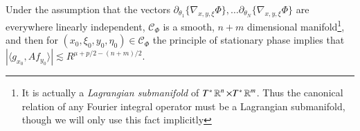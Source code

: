 Under the assumption that the vectors $\partial_{\theta_1} \{ \nabla_{x,y,\xi} \Phi \}, \dots \partial_{\theta_N} \{ \nabla_{x,y,\xi} \Phi \}$ are everywhere linearly independent, $\mathcal{C}_\Phi$ is a smooth, $n + m$ dimensional manifold\footnote{It is actually a \emph{Lagrangian submanifold} of $T^* \operatorname{\mathbb{R}}^n \times T^* \operatorname{\mathbb{R}}^m$. Thus the canonical relation of any Fourier integral operator must be a Lagrangian submanifold, though we will only use this fact implicitly}, and then for $(x_0,\xi_0,y_0,\eta_0) \in \mathcal{C}_\Phi$ the principle of stationary phase implies that $|\langle g_{x_0}, Af_{y_0} \rangle| \lesssim R^{\mu + p/2 - (n+m)/2}$.
%
%
% 
% 
% 
% 
%
%
%
%
%
%
%
%
%
%
%

% 

